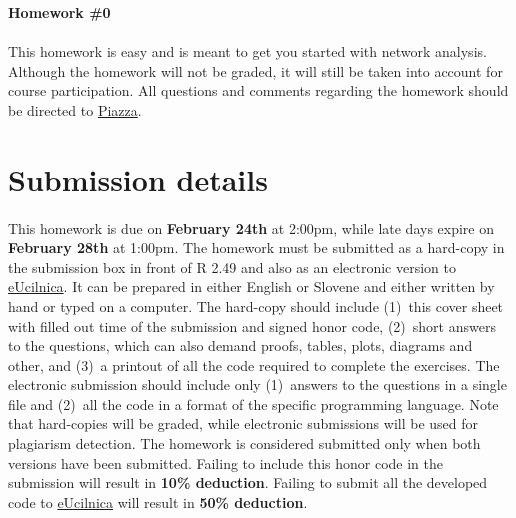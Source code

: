 \documentclass[11pt,a4paper]{article}
\begin{document}
 

\thispagestyle{titlestyle}

\vspace*{0.05in} 
\begin{center} 
	{\huge\bf Homework {\color{magenta}\#0}} 
\end{center} 
\vspace*{0.05in} 

\paragraph{} This homework is easy and is meant to get you started with network analysis. Although the homework will not be graded, it will still be taken into account for course participation. All questions and comments regarding the homework should be directed to \href{https://piazza.com}{Piazza}.

\section*{Submission details}

\paragraph{} This homework is due on {\bf\color{magenta} February 24th} at 2:00pm, while late days expire on {\bf\color{magenta} February 28th} at 1:00pm. The homework must be submitted as a hard-copy in the submission box in front of R 2.49 and also as an electronic version to \href{https://ucilnica.fri.uni-lj.si/course/view.php?id=183}{eUcilnica}. It can be prepared in either English or Slovene and either written by hand or typed on a computer. The hard-copy should include (1)~this cover sheet with filled out time of the submission and signed honor code, (2)~short answers to the questions, which can also demand proofs, tables, plots, diagrams and other, and (3)~a printout of all the code required to complete the exercises. The electronic submission should include only (1)~answers to the questions in a single file and (2)~all the code in a format of the specific programming language. Note that hard-copies will be graded, while electronic submissions will be used for plagiarism detection. The homework is considered submitted only when both versions have been submitted. Failing to include this honor code in the submission will result in {\bf\color{LimeGreen} 10\% deduction}. Failing to submit all the developed code to \href{https://ucilnica.fri.uni-lj.si/course/view.php?id=183}{eUcilnica} will result in {\bf\color{LimeGreen} 50\% deduction}.
\end{document}

